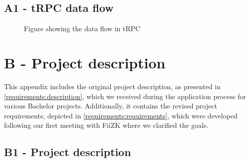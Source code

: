 \newpage
\section*{\large{A1 - tRPC data flow}}
\vspace*{1cm}

\begin{figure}[!ht]
   \begin{minipage}{1\textwidth}
     \centering
     
     \caption[Data flow in tRPC]{Figure showing the data flow in tRPC \cite{tRPC_dataflow_Ehrlich}
     }
     \label{trpc:figure}
   \end{minipage}\hfill
\end{figure}



\newpage
\chapter*{B - Project description}
\label{chap:project-description}

This appendix includes the original project description, as presented in \autoref{requirements:description}, which we received during the application process for various Bachelor projects. Additionally, it contains the revised project requirements, depicted in \autoref{requirements:requirements}, which were developed following our first meeting with FiiZK where we clarified the goals. 


\renewcommand{\thefigure}{B.\arabic{figure}}
\setcounter{figure}{0}
\renewcommand{\thetable}{B.\arabic{table}}
\setcounter{table}{0}

\newpage
\section*{\large{B1 - Project description}}
\vspace*{1cm}

